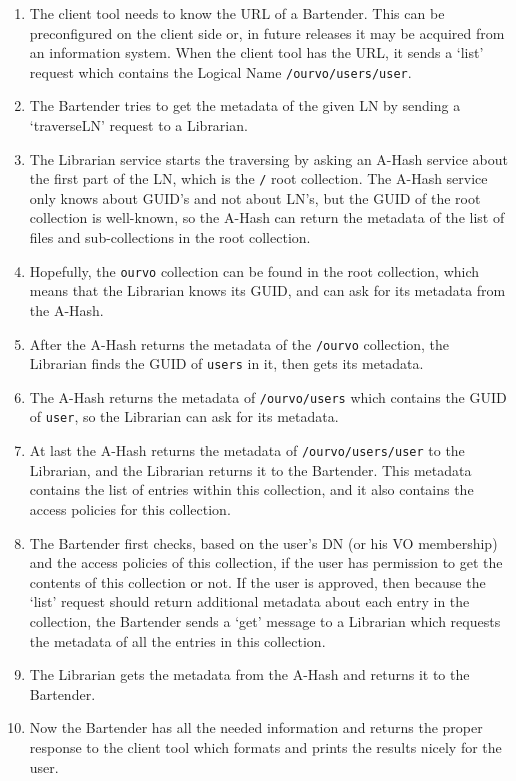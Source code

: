 \documentclass{book}
\begin{document}
\begin{enumerate}
    \item The client tool needs to know the URL of a Bartender. This can be preconfigured on the client side or, in future releases it may be acquired from an information system. When the client tool has the URL, it sends a `list' request which contains the Logical Name \verb!/ourvo/users/user!.
    \item The Bartender tries to get the metadata of the given LN by sending a `traverseLN' request to a Librarian.
    \item The Librarian service starts the traversing by asking an A-Hash service about the first part of the LN, which is the \verb!/! root collection. The A-Hash service only knows about GUID's and not about LN's, but the GUID of the root collection is well-known, so the A-Hash can return the metadata of the list of files and sub-collections in the root collection.
    \item Hopefully, the \verb!ourvo! collection can be found in the root collection, which means that the Librarian knows its GUID, and can ask for its metadata from the A-Hash.
    \item After the A-Hash returns the metadata of the \verb!/ourvo! collection, the Librarian finds the GUID of \verb!users! in it, then gets its metadata.
    \item The A-Hash returns the metadata of \verb!/ourvo/users! which contains the GUID of \verb!user!, so the Librarian can ask for its metadata.
    \item At last the A-Hash returns the metadata of \verb!/ourvo/users/user! to the Librarian, and the Librarian returns it to the Bartender. This metadata contains the list of entries within this collection, and it also contains the access policies for this collection.
    \item The Bartender first checks, based on the user's DN (or his VO membership) and the access policies of this collection, if the user has permission to get the contents of this collection or not. If the user is approved, then because the `list' request should return additional metadata about each entry in the collection, the Bartender sends a `get' message to a Librarian which requests the metadata of all the entries in this collection.
    \item The Librarian gets the metadata from the A-Hash and returns it to the Bartender.
    \item Now the Bartender has all the needed information and returns the proper response to the client tool which formats and prints the results nicely for the user.
\end{enumerate}
\end{document}
